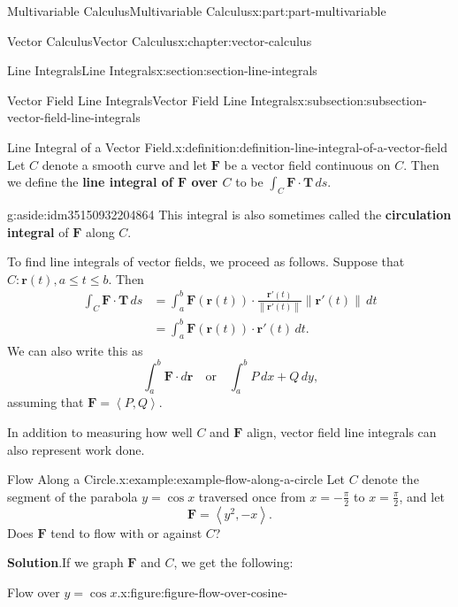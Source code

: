\documentclass[twoside,10pt,]{book}
\newcommand{\blocktitlefont}{\relax}
\newcommand{\terminology}[1]{\textbf{#1}}
\numberwithin{equation}{part}
\newcommand{\vb}[1]{\mathbf{#1}}
\newcommand{\norm}[1]{\left\| #1 \right\|}
\newcommand{\dotprod}[1]{\left\langle #1 \right\rangle}
\newcommand{\qq}[1]{\quad\text{#1}\quad}
\newcommand{\amp}{&}
\begin{document}
\begin{partptx}{Multivariable Calculus}{}{Multivariable Calculus}{}{}{x:part:part-multivariable}
\begin{chapterptx}{Vector Calculus}{}{Vector Calculus}{}{}{x:chapter:vector-calculus}
\begin{sectionptx}{Line Integrals}{}{Line Integrals}{}{}{x:section:section-line-integrals}
\begin{subsectionptx}{Vector Field Line Integrals}{}{Vector Field Line Integrals}{}{}{x:subsection:subsection-vector-field-line-integrals}
\begin{definition}{Line Integral of a Vector Field.}{x:definition:definition-line-integral-of-a-vector-field}%
%
Let \(C\) denote a smooth curve and let \(\vb{F}\) be a vector field continuous on \(C\). Then we define the \terminology{line integral of \(\vb{F}\) over \(C\)} to be \(\int_{C}\vb{F}\cdot\vb{T}\,ds\).%
\begin{aside}{}{g:aside:idm35150932204864}%
This integral is also sometimes called the \terminology{circulation integral} of \(\vb{F}\) along \(C\).%
\end{aside}
\end{definition}
To find line integrals of vector fields, we proceed as follows. Suppose that \(C:\vb{r}(t), a\leq t\leq b\). Then%
\begin{align*}
\int_{C}\vb{F}\cdot\vb{T}\,ds \amp = \int_{a}^{b}\vb{F}(\vb{r}(t))\cdot\frac{\vb{r}'(t)}{\norm{\vb{r}'(t)}}\norm{\vb{r}'(t)}\,dt \\
\amp = \int_{a}^{b}\vb{F}(\vb{r}(t))\cdot\vb{r}'(t)\,dt \text{.}
\end{align*}
We can also write this as%
\begin{equation*}
\int_{a}^{b}\vb{F}\cdot d\vb{r} \qq{or} \int_{a}^{b} P\,dx + Q\,dy\text{,}
\end{equation*}
assuming that \(\vb{F} = \dotprod{P,Q}\).%
\par
In addition to measuring how well \(C\) and \(\vb{F}\) align, vector field line integrals can also represent work done.%
\begin{example}{Flow Along a Circle.}{x:example:example-flow-along-a-circle}%
Let \(C\) denote the segment of the parabola \(y = \cos x\) traversed once from \(x = -\frac{\pi}{2}\) to \(x = \frac{\pi}{2}\), and let%
\begin{equation*}
\vb{F} = \dotprod{y^{2}, -x}\text{.}
\end{equation*}
Does \(\vb{F}\) tend to flow with or against \(C\)?%
\par\smallskip%
\noindent\textbf{\blocktitlefont Solution}.\hypertarget{g:solution:idm35150932196416}{}\quad{}If we graph \(\vb{F}\) and \(C\), we get the following: \begin{figureptx}{Flow over \(y = \cos x\).}{x:figure:figure-flow-over-cosine-}{}%
\begin{image}{0}{1}{0}%

\end{image}
\end{figureptx}
\end{example}
\end{subsectionptx}
\end{sectionptx}
\end{chapterptx}
\end{partptx}
\end{document}
